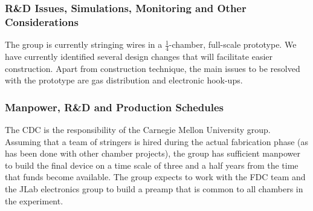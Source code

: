 \subsubsection*{R\&D Issues, Simulations, Monitoring and Other Considerations}

The group is currently stringing wires in a $\frac{1}{4}$-chamber, full-scale 
prototype. We have currently identified several design changes that will
facilitate easier construction. Apart from construction technique, the main
 issues to be resolved with the prototype are gas distribution and electronic
hook-ups.  


\subsubsection*{Manpower, R\&D and Production Schedules}

The CDC is the responsibility of the Carnegie Mellon University group. Assuming that
a team of stringers is hired during the actual fabrication phase (as has been
done with other chamber projects), the group has sufficient manpower to build the
final device on a time scale of three and a half years from the time that funds
become available. The group expects to work with the FDC team and the JLab electronics
group to build a preamp that is common to all chambers in the experiment.  

